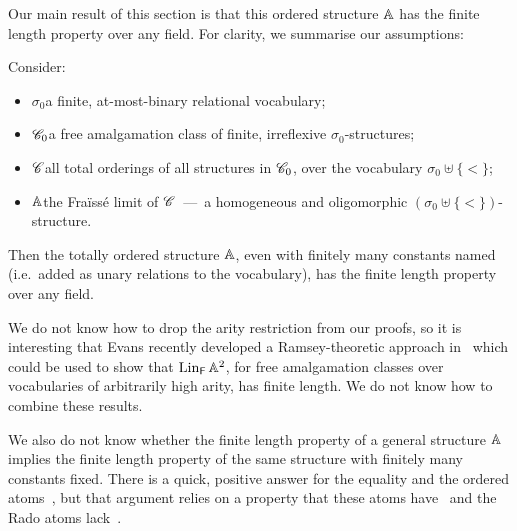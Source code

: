 Our main result of this section is that this ordered structure $\mathbb{A}$ has the finite length property over any field.
For clarity, we summarise our assumptions:
\begin{theorem}\label{thm:ordered-free-amalg-has-finite-length}
    Consider:
    \begin{itemize}
        \item $\sigma_0$\quad a finite, at-most-binary relational vocabulary;
        \item $\mathscr{C}_0$\quad a free amalgamation class of finite, irreflexive $\sigma_0$-structures;
        \item $\mathscr{C}$\quad all total orderings of all structures in $\mathscr{C}_0$, over the vocabulary $\sigma_0 \uplus \{<\}$;
        \item $\mathbb{A}$\quad the Fraïssé limit of $\mathscr{C}$~---~a homogeneous and oligomorphic $(\sigma_0 \uplus \{<\})$-structure.
    \end{itemize}
    Then the totally ordered structure $\mathbb{A}$, even with finitely many constants named (i.e.~added as unary relations to the vocabulary), has the finite length property over any field.
\end{theorem}

\begin{remark}
    We do not know how to drop the arity restriction from our proofs, 
    so it is interesting that Evans recently developed a Ramsey-theoretic approach in~\cite{Evans_pm1} which could be used to show that $\operatorname{Lin}_{\mathsf{F}} \mathbb{A}^2$, 
    for free amalgamation classes over vocabularies of arbitrarily high arity, has finite length.
    We do not know how to combine these results.

    We also do not know whether the finite length property of a general structure $\mathbb{A}$ implies the finite length property of the same structure with finitely many constants fixed.
    There is a quick, positive answer for the equality and the ordered atoms~\cite[Thm.~4.10]{BFKM24},
    but that argument relies on a property that these atoms have~\cite[Lem.~2.21]{BodirskyBodorMarimon_25} and the Rado atoms lack~\cite{no-constant-interpreted-in-Rado}.
\lipicsEnd\end{remark}


 


